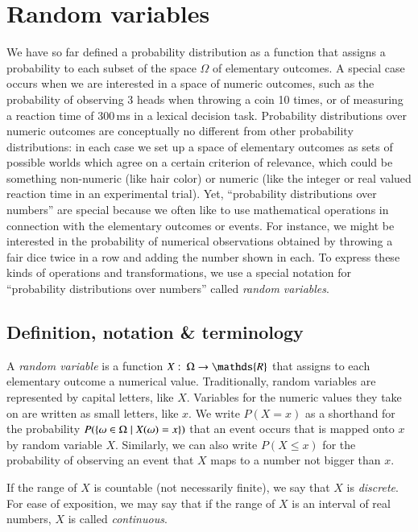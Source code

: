 \documentclass[nobib,nofonts]{tufte-handout}
\renewcommand{\markdef}[1]{\emph{#1}}
\begin{document}
\newpage

\section{Random variables}

We have so far defined a probability distribution as a function that assigns a probability to
each subset of the space $\Omega$ of elementary outcomes.
A special case occurs when we are interested in a space of numeric outcomes, such as the probability of observing 3 heads when throwing a coin 10 times, or of measuring a reaction time of 300\,ms in a lexical decision task.
Probability distributions over numeric outcomes are conceptually no different from other probability distributions: in each case we set up a space of elementary outcomes as sets of possible worlds which agree on a certain criterion of relevance, which could be something non-numeric (like hair color) or numeric (like the integer or real valued reaction time in an experimental trial).
Yet, ``probability distributions over numbers'' are special because we often like to use mathematical operations in connection with the elementary outcomes or events.
For instance, we might be interested in the probability of numerical observations obtained by throwing a fair dice twice in a row and adding the number shown in each.
To express these kinds of operations and transformations, we use a special notation for ``probability distributions over numbers'' called \emph{random variables}.
\subsection{Definition, notation \& terminology}

A \markdef{random variable} is a function $X \mycolon \Omega \rightarrow \mathds{R}$ that
assigns to each elementary outcome a numerical value.
Traditionally, random variables are represented by capital letters, like $X$. Variables for the
numeric values they take on are written as small letters, like $x$.
We write $P(X = x)$ as a shorthand for the probability
$P(\left\{\omega \in \Omega \mid X(\omega) = x\right\})$ that an event occurs that is mapped onto $x$ by
random variable $X$. Similarly, we can also write $P(X \le x)$ for the probability
of observing an event that $X$ maps to a number not bigger than $x$.

If the range of $X$ is countable (not necessarily finite), we say that $X$ is \markdef{discrete}. For ease of exposition, we may say that if the range of $X$ is an interval of real numbers, $X$ is called \markdef{continuous}.
\end{document}
